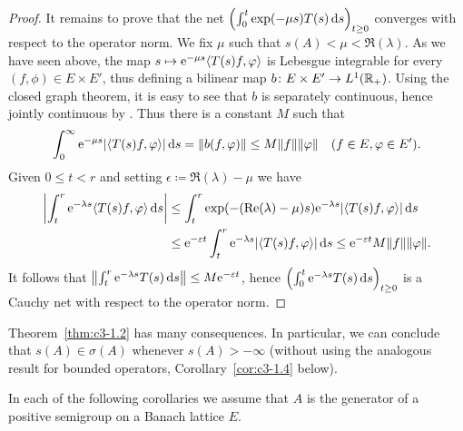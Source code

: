 \begin{proof}
It remains to prove that the net $\left(\int_{0}^t \exp(-\mu s)T(s) \ds \right)_{t\geq 0}$ converges with respect to the operator norm.
We fix $\mu$ such that $s(A) < \mu < \Re(\lambda)$.
As we have seen above, the map $s \mapsto \eu^{-\mu s}\langle T(s)f,\phi\rangle$ is Lebesgue integrable for every $(f,\phi) \in E \times E'$, thus defining a bilinear map $b \colon E \times E' \to L^1(\mathbb{R} _{+})$.
Using the closed graph theorem, it is easy to see that $b$ is separately continuous, hence jointly continuous by \textcite[III.Theorem~5.1]{schaefer:1966}.
Thus there is a constant $M$ such that
\begin{equation}\label{eq:c3-1.4}
	\int_{0}^{\infty} \eu^{-\mu s}|\langle T(s)f,\phi\rangle| \ds  = \|b(f,\phi)\| \leq M\|f\|\|\phi\| \quad (f \in E, \phi \in E') .
\end{equation}
Given $0 \leq t < r$ and setting $\epsilon \coloneq \Re(\lambda) - \mu$ we have
\begin{align*}
	\left|\int_{t}^r \eu^{-\lambda s}\langle T(s)f,\phi\rangle \ds \right| &\leq \int_{t}^r \exp(-(\Re(\lambda)-\mu)s)\eu^{-\lambda s}|\langle T(s)f,\phi\rangle| \ds  \\
	&\leq \eu^{-\epsilon t}\int_{t}^r \eu^{-\lambda s}|\langle T(s)f,\phi\rangle| \ds  \leq \eu^{-\epsilon t} M\|f\|\|\phi\|.
\end{align*}
It follows that $\left\|\int_{t}^r \eu^{-\lambda s}T(s) \ds \right\| \leq M\eu^{-\epsilon t}$, hence $\left(\int_{0}^t \eu^{-\lambda s}T(s) \ds \right)_{t\geq 0}$ is a Cauchy net with respect to the operator norm.
\end{proof}
Theorem~\ref{thm:c3-1.2} has many consequences.
In particular, we can conclude that $s(A) \in \sigma(A)$ whenever $s(A) > -\infty$ (without using the analogous result for bounded operators, \cf Corollary~\ref{cor:c3-1.4} below).

In each of the following corollaries we assume that $A$ is the generator of a positive semigroup on a Banach lattice $E$.

